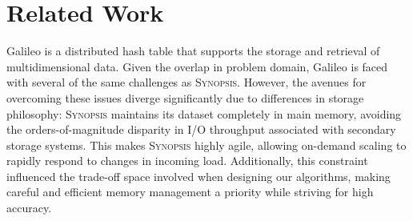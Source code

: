 \section{Related Work}
\label{sec:related}

Galileo \cite{} is a distributed hash table that supports the storage and retrieval of multidimensional data. Given the overlap in problem domain, Galileo is faced with several of the same challenges as \textsc{Synopsis}. However, the avenues for overcoming these issues diverge significantly due to differences in storage philosophy: \textsc{Synopsis} maintains its dataset completely in main memory, avoiding the orders-of-magnitude disparity in I/O throughput associated with secondary storage systems. This makes \textsc{Synopsis} highly agile, allowing on-demand scaling to rapidly respond to changes in incoming load. Additionally, this constraint influenced the trade-off space involved when designing our algorithms, making careful and efficient memory management a priority while striving for high accuracy.

